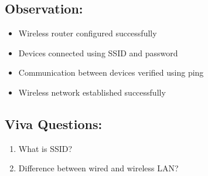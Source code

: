 \documentclass[a4paper,10pt]{article}
\begin{document}
\subsection{Observation:}
\begin{itemize}
    \item Wireless router configured successfully
    \item Devices connected using SSID and password
    \item Communication between devices verified using ping
    \item Wireless network established successfully
\end{itemize}

\subsection{Viva Questions:}
\begin{enumerate}
    \item What is SSID?
    \item Difference between wired and wireless LAN?
\end{enumerate}
    
\end{document}

